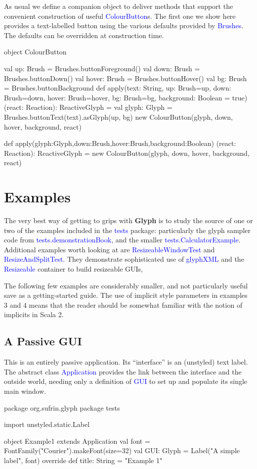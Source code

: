 \documentclass[12pt,a4paper]{article}
\def\Scala#1{\textcolor{blue}{\textsf{#1}}}
\def\S#1{\section{#1}}
\def\SS#1{\subsection{#1}}
\begin{document}
As usual we define a companion object to deliver methods
that support the convenient construction of useful \Scala{ColourButton}s.
The first one we show here provides a text-labelled button
using the various defaults provided by \Scala{Brushes}. The defaults
can be overridden at construction time.

\begin{scala}
object ColourButton {
 val up:    Brush = Brushes.buttonForeground()
 val down:  Brush = Brushes.buttonDown()
 val hover: Brush = Brushes.buttonHover()
 val bg:    Brush = Brushes.buttonBackground
 def apply(text:  String,
           up: Brush=up, down: Brush=down, hover: Brush=hover,
           bg: Brush=bg, background: Boolean = true)
          (react: Reaction): ReactiveGlyph =
 { val glyph: Glyph = Brushes.buttonText(text).asGlyph(up, bg)
   new ColourButton(glyph, down, hover, background, react)
 }

 def apply(glyph:Glyph,down:Brush,hover:Brush,background:Boolean)
          (react: Reaction): ReactiveGlyph =
     new ColourButton(glyph, down, hover, background, react)
}
\end{scala}
\clearpage
\S{Examples}

The very best way of getting to grips with \textbf{Glyph} is to
study the source of one or two of the examples included in the
\Scala{tests} package: particularly the glyph sampler code from
\Scala{tests.demonstrationBook}, and the smaller
\Scala{tests.CalculatorExample}.  Additional examples worth looking
at are \Scala{ResizeableWindowTest} and \Scala{ResizeAndSplitTest}.
They demonstrate sophisticated use of \Scala{glyphXML} 
and the \Scala{Resizeable} container to build resizeable GUIs,

The following few examples are considerably smaller, and not
particularly useful save as a getting-started guide.  The use of
implicit style parameters in examples 3 and 4 means that the reader
should be somewhat familiar with the notion of implicits in Scala
2.


\SS{A Passive GUI}

This is an entirely passive application.
Its ``interface'' is an (unstyled) text label.
The abstract class \Scala{Application} provides the link between
the interface and the outside world, needing only a definition of
\Scala{GUI} to set up and populate its single main window.

\begin{scala}
package org.sufrin.glyph
package tests

import unstyled.static.Label

object Example1 extends Application  {
  val font = FontFamily("Courier").makeFont(size=32)
  val GUI: Glyph = Label("A simple label", font)
  override def title: String = "Example 1"
}
\end{scala}
\end{document}
